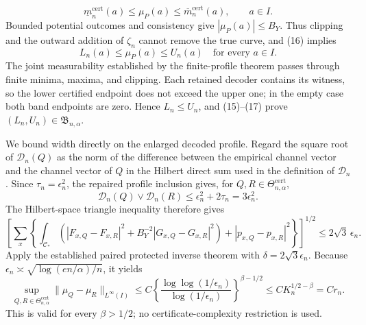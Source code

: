 \[
 \underline m^{\mathrm{cert}}_n(a)
 \le\mu_P(a)\le
 \overline m^{\mathrm{cert}}_n(a),\qquad a\in I.              \tag{16}
\]
Bounded potential outcomes and consistency give \(|\mu_P(a)|\le B_Y\).  Thus clipping and the outward addition of \(\zeta_n\) cannot remove the true curve, and (16) implies
\[
 L_n(a)\le\mu_P(a)\le U_n(a)\quad\text{for every }a\in I. \tag{17}
\]
The joint measurability established by the finite-profile theorem passes through finite minima, maxima, and clipping.  Each retained decoder contains its witness, so the lower certified endpoint does not exceed the upper one; in the empty case both band endpoints are zero.  Hence \(L_n\le U_n\), and (15)--(17) prove \((L_n,U_n)\in\mathfrak B_{n,\alpha}\).

We bound width directly on the enlarged decoded profile.  Regard the square root of \(\mathscr D_n(Q)\) as the norm of the difference between the empirical channel vector and the channel vector of \(Q\) in the Hilbert direct sum used in the definition of \(\mathscr D_n\).  Since \(\tau_n=\epsilon_n^2\), the repaired profile inclusion gives, for \(Q,R\in\Theta^{\mathrm{cert}}_{n,\alpha}\),
\[
 \mathscr D_n(Q)\vee\mathscr D_n(R)
 \le\epsilon_n^2+2\tau_n=3\epsilon_n^2.                     \tag{18}
\]
The Hilbert-space triangle inequality therefore gives
\[
 \left[\sum_x\left\{\int_{\mathcal C_*}
 \left(|F_{x,Q}-F_{x,R}|^2+B_Y^{-2}|G_{x,Q}-G_{x,R}|^2\right)
 +|p_{x,Q}-p_{x,R}|^2\right\}\right]^{1/2}
 \le2\sqrt3\,\epsilon_n.                                    \tag{19}
\]
Apply the established paired protected inverse theorem with \(\delta=2\sqrt3\epsilon_n\).  Because \(\epsilon_n\asymp\sqrt{\log(en/\alpha)/n}\), it yields
\[
 \sup_{Q,R\in\Theta^{\mathrm{cert}}_{n,\alpha}}
 \|\mu_Q-\mu_R\|_{L^\infty(I)}
 \le C\left\{\frac{\log\log(1/\epsilon_n)}
                      {\log(1/\epsilon_n)}\right\}^{\beta-1/2}
 \le C K_n^{1/2-\beta}=C r_n.                               \tag{20}
\]
This is valid for every \(\beta>1/2\); no certificate-complexity restriction is used.

